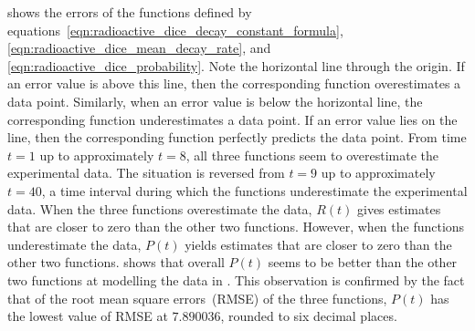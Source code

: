 \documentclass[a4paper,oneside,12pt]{article}
\begin{document}
\begin{problem}
{\begin{solution}
 shows the errors of the functions
defined by
equations~\eqref{eqn:radioactive_dice_decay_constant_formula},
\eqref{eqn:radioactive_dice_mean_decay_rate}, and
\eqref{eqn:radioactive_dice_probability}.  Note the horizontal line
through the origin.  If an error value is above this line, then the
corresponding function overestimates a data point.  Similarly, when an
error value is below the horizontal line, the corresponding function
underestimates a data point.  If an error value lies on the line, then
the corresponding function perfectly predicts the data point.  From
time $t = 1$ up to approximately $t = 8$, all three functions seem to
overestimate the experimental data.  The situation is reversed from
$t = 9$ up to approximately $t = 40$, a time interval during which the
functions underestimate the experimental data.  When the three
functions overestimate the data, $R(t)$ gives estimates that are
closer to zero than the other two functions.  However, when the
functions underestimate the data, $P(t)$ yields estimates that are
closer to zero than the other two functions.
 shows that overall $P(t)$ seems
to be better than the other two functions at modelling the data in
.  This observation is confirmed by the
fact that of the root mean square errors~(RMSE) of the three
functions, $P(t)$ has the lowest value of RMSE at $7.890036$, rounded
to six decimal places.
\end{solution}
}{}

\begin{table}[!htbp]
\centering

\caption{%
  The radioactive decay of a sample of $4.0291$ grams of aluminium.
  The sample was neutron activated for $30$ minutes.  Then a Geiger
  counter was used to measure the number of remaining radioactive
  isotopes after the listed numbers of seconds.  The experiment was
  performed by Steven Sahyun of the University of Wisconsin at
  Whitewater, USA on $13$-th January~$2005$.
}
\label{tab:aluminium_radioactive_decay}
\end{table}


\end{problem}
\end{document}
